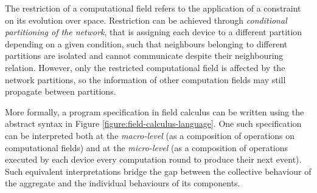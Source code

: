 The restriction of a computational field refers to the application of a
constraint on its evolution over space. Restriction can be achieved through
\textit{conditional partitioning of the network}, that is assigning each device
to a different partition depending on a given condition, such that neighbours
belonging to different partitions are isolated and cannot communicate despite
their neighbouring relation. However, only the restricted computational field
is affected by the network partitions, so the information of other computation
fields may still propagate between partitions.

More formally, a program specification in field calculus can be written using
the abstract syntax in Figure \ref{figure:field-calculus-language}. One such
specification can be interpreted both at the \textit{macro-level} (as a
composition of operations on computational fields) and at the
\textit{micro-level} (as a composition of operations executed by each device
every computation round to produce their next event). Such equivalent
interpretations bridge the gap between the collective behaviour of the
aggregate and the individual behaviours of its components.

